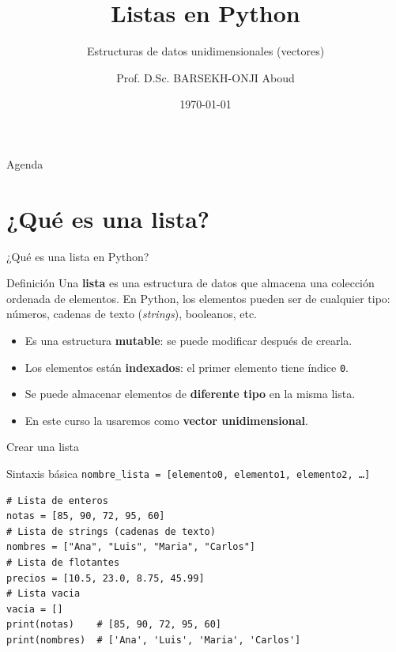 \documentclass[aspectratio=169,xcolor=dvipsnames]{beamer}
\title{Listas en Python}
\subtitle{Estructuras de datos unidimensionales (vectores)}
\author{Prof. D.Sc. BARSEKH-ONJI Aboud}
\institute{
    Facultad de Ingeniería \\
    Universidad Anáhuac México
}
\date{\today}
\begin{document}
\begin{frame}
    \titlepage
\end{frame}

\begin{frame}{Agenda}
    \tableofcontents
\end{frame}

\section{¿Qué es una lista?}

\begin{frame}{¿Qué es una lista en Python?}
    \begin{block}{Definición}
        Una \textbf{lista} es una estructura de datos que almacena una colección ordenada de elementos. En Python, los elementos pueden ser de cualquier tipo: números, cadenas de texto (\textit{strings}), booleanos, etc.
    \end{block}
    \vspace{0.3cm}
    \begin{itemize}
        \item Es una estructura \textbf{mutable}: se puede modificar después de crearla.
        \item Los elementos están \textbf{indexados}: el primer elemento tiene índice \texttt{0}.
        \item Se puede almacenar elementos de \textbf{diferente tipo} en la misma lista.
        \item En este curso la usaremos como \textbf{vector unidimensional}.
    \end{itemize}
\end{frame}

\begin{frame}[fragile]{Crear una lista}
    \begin{block}{Sintaxis básica}
        \texttt{nombre\_lista = [elemento0, elemento1, elemento2, \ldots]}
    \end{block}
    \vspace{0.2cm}
\begin{lstlisting}[style=PythonStyle]
# Lista de enteros
notas = [85, 90, 72, 95, 60]
# Lista de strings (cadenas de texto)
nombres = ["Ana", "Luis", "Maria", "Carlos"]
# Lista de flotantes
precios = [10.5, 23.0, 8.75, 45.99]
# Lista vacia
vacia = []
print(notas)    # [85, 90, 72, 95, 60]
print(nombres)  # ['Ana', 'Luis', 'Maria', 'Carlos']
\end{lstlisting}
\end{frame}
\end{document}
